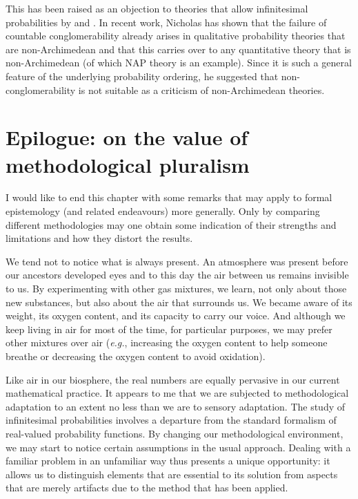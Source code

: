 This has been raised as an objection to theories that allow infinitesimal probabilities by \citet{Pruss:2012} and \citeyear{Pruss:2014}. In recent work, Nicholas \citet[p.~1200]{DiBella:2018} has shown that the failure of countable conglomerability already arises in qualitative probability theories that are non-Archimedean and that this carries over to any quantitative theory that is non-Archimedean (of which NAP theory is an example). Since it is such a general feature of the underlying probability ordering, he suggested that non-conglomerability is not suitable as a criticism of non-Archimedean theories.

\section{Epilogue: on the value of methodological pluralism}
I would like to end this chapter with some remarks that may apply to formal epistemology (and related endeavours) more generally. Only by comparing different methodologies may one obtain some indication of their strengths and limitations and how they distort the results.

We tend not to notice what is always present. An atmosphere was present before our ancestors developed eyes and to this day the air between us remains invisible to us. By experimenting with other gas mixtures, we learn, not only about those new substances, but also about the air that surrounds us. We became aware of its weight, its oxygen content, and its capacity to carry our voice.
And although we keep living in air for most of the time, for particular purposes, we may prefer other mixtures over air (\textit{e.g.}, increasing the oxygen content to help someone breathe or decreasing the oxygen content to avoid oxidation).

Like air in our biosphere, the real numbers are equally pervasive in our current mathematical practice. It appears to me that we are subjected to methodological adaptation to an extent no less than we are to sensory adaptation. The study of infinitesimal probabilities involves a departure from the standard formalism of real-valued probability functions. By changing our methodological environment, we may start to notice certain assumptions in the usual approach. Dealing with a familiar problem in an unfamiliar way thus presents a unique opportunity: it allows us to distinguish elements that are essential to its solution from aspects that are merely artifacts due to the method that has been applied.

